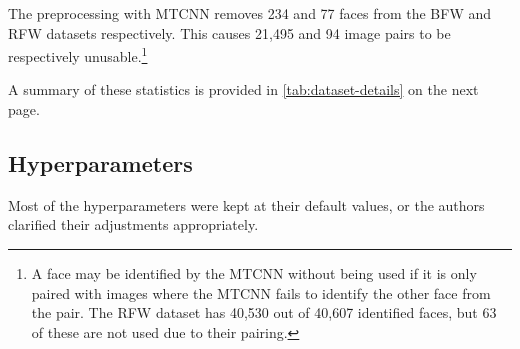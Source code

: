 The preprocessing with MTCNN removes 234 and 77 faces from the BFW and RFW datasets respectively.
This causes 21,495 and 94 image pairs to be respectively unusable.\footnote{A face may be identified by the MTCNN without being used if it is only paired with images where the MTCNN fails to identify the other face from the pair. The RFW dataset has 40,530 out of 40,607 identified faces, but 63 of these are not used due to their pairing.}

A summary of these statistics is provided in \autoref{tab:dataset-details} on the next page.

\begin{table}[ht]
    \centering
    \caption{Overview of the used fairness evaluation datasets.}
    \label{tab:dataset-details}
\end{table}

\subsection{Hyperparameters}

Most of the hyperparameters were kept at their default values, or the authors clarified their adjustments appropriately.

